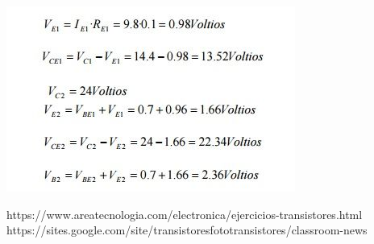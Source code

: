 \documentclass[10pt,a4paper]{article}
\begin{document}
\begin{center}
\includegraphics[scale=0.8]{13.png}
\end{center}


{}
{https://www.areatecnologia.com/electronica/ejercicios-transistores.html\\https://sites.google.com/site/transistoresfototransistores/classroom-news}
\end{document}
